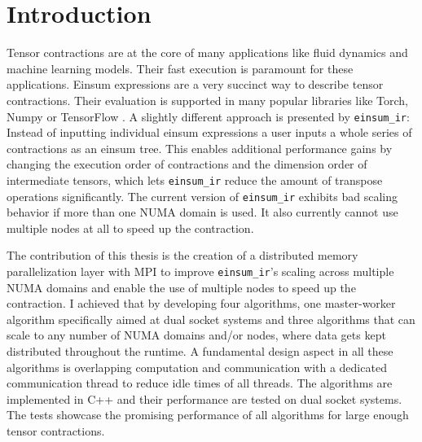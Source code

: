 \section{Introduction}

Tensor contractions are at the core of many applications like fluid dynamics and machine learning models.
Their fast execution is paramount for these applications.
Einsum expressions are a very succinct way to describe tensor contractions.
Their evaluation is supported in many popular libraries like Torch\cite{torch}, Numpy\cite{numpy} or TensorFlow \cite{tensorflow}.
A slightly different approach is presented by \texttt{einsum\_ir}\cite{einsum_ir}:
Instead of inputting individual einsum expressions a user inputs a whole series of contractions as an einsum tree.
This enables additional performance gains by changing the execution order of contractions and the dimension order of intermediate tensors, which lets \texttt{einsum\_ir} reduce the amount of transpose operations significantly.
The current version of \texttt{einsum\_ir} exhibits bad scaling behavior if more than one NUMA domain is used.
It also currently cannot use multiple nodes at all to speed up the contraction.

The contribution of this thesis is the creation of a distributed memory parallelization layer with MPI to improve \texttt{einsum\_ir}'s scaling across multiple NUMA domains and enable the use of multiple nodes to speed up the contraction.
I achieved that by developing four algorithms, one master-worker algorithm specifically aimed at dual socket systems and three algorithms that can scale to any number of NUMA domains and/or nodes, where data gets kept distributed throughout the runtime.
A fundamental design aspect in all these algorithms is overlapping computation and communication with a dedicated communication thread to reduce idle times of all threads.
The algorithms are implemented in C++ and their performance are tested on dual socket systems.
The tests showcase the promising performance of all algorithms for large enough tensor contractions.

